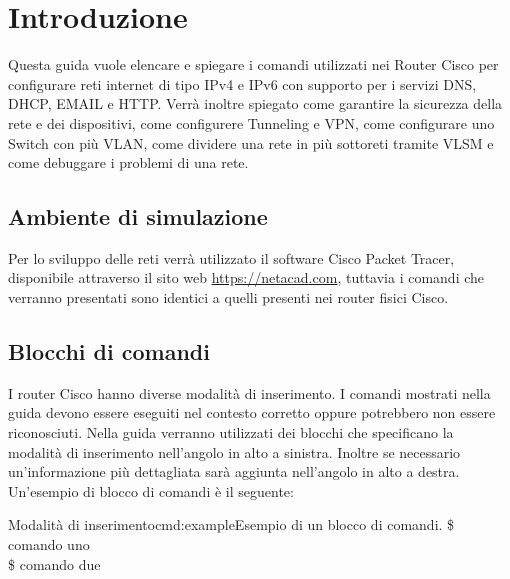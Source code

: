 \section{Introduzione}
Questa guida vuole elencare e spiegare i comandi utilizzati nei Router Cisco per configurare reti internet di tipo IPv4 e IPv6 con supporto per i servizi DNS, DHCP, EMAIL e HTTP\@. Verrà inoltre spiegato come garantire la sicurezza della rete e dei dispositivi, come configurere Tunneling e VPN, come configurare uno Switch con più VLAN, come dividere una rete in più sottoreti tramite VLSM e come debuggare i problemi di una rete\@.

\subsection{Ambiente di simulazione}
Per lo sviluppo delle reti verrà utilizzato il software Cisco Packet Tracer, disponibile attraverso il sito web \url{https://netacad.com}, tuttavia i comandi che verranno presentati sono identici a quelli presenti nei router fisici Cisco.

\subsection{Blocchi di comandi}
I router Cisco hanno diverse modalità di inserimento. I comandi mostrati nella guida devono essere eseguiti nel contesto corretto oppure potrebbero non essere riconosciuti. Nella guida verranno utilizzati dei blocchi che specificano la modalità di inserimento nell'angolo in alto a sinistra. Inoltre se necessario un'informazione più dettagliata sarà aggiunta nell'angolo in alto a destra. Un'esempio di blocco di comandi è il seguente:

\begin{cmds}[Dispositivo]{Modalità di inserimento}{cmd:example}{Esempio di un blocco di comandi.}
    \$ comando uno\\
    \$ comando due
\end{cmds}